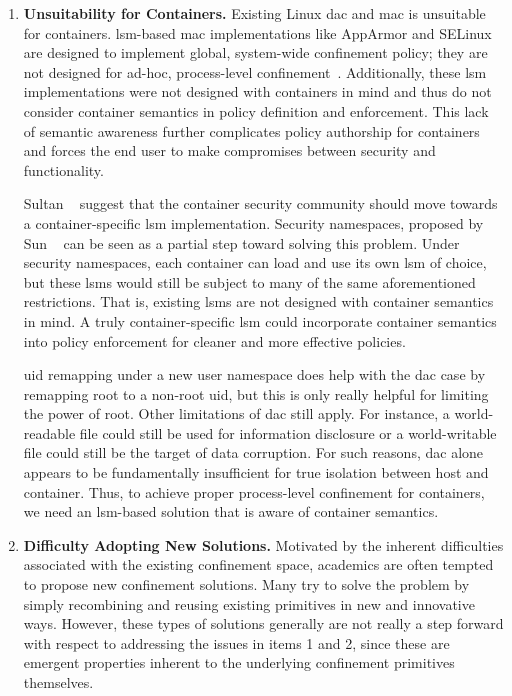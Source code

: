\documentclass[
  fontsize=12pt,
  titlepage=firstiscover,
  paper=letter,
oneside,
  cleardoublepage=plain,
  parskip=half-,
  DIV=10,
  parindent,
  appendixprefix,
  chapterprefix,
  listof=totoc,
]{scrbook}
\begin{document}
\begin{enumerate}[font=\bfseries]
  \item \label{i:problem-unsuitability} \textbf{Unsuitability for Containers.}
    Existing Linux \gls{dac} and \gls{mac} is unsuitable for containers.
    \gls{lsm}-based \gls{mac} implementations like AppArmor and SELinux are
    designed to implement global, system-wide confinement policy; they are not designed
    for ad-hoc, process-level confinement~\cite{belair2019_leveraging}. Additionally,
    these \gls{lsm} implementations were not designed with containers in mind and thus
    do not consider container semantics in policy definition and enforcement. This lack
    of semantic awareness further complicates policy authorship for containers and
    forces the end user to make compromises between security and functionality.

    Sultan \etal~\cite{sultan2019_container_security} suggest that the container
    security community should move towards a container-specific \gls{lsm}
    implementation. Security namespaces, proposed by Sun
    \etal~\cite{sun2018_security_namespace} can be seen as a partial step toward solving
    this problem.  Under security namespaces, each container can load and use its own
    \gls{lsm} of choice, but these \glspl{lsm} would still be subject to many of the
    same aforementioned restrictions. That is, existing \glspl{lsm} are not designed
    with container semantics in mind. A truly container-specific \gls{lsm} could incorporate
    container semantics into policy enforcement for cleaner and more effective policies.

    \gls{uid} remapping under a new user namespace does help with the \gls{dac} case by
    remapping root to a non-root \gls{uid}, but this is only really helpful for limiting
    the power of root. Other limitations of \gls{dac} still apply. For instance,
    a world-readable file could still be used for information disclosure or
    a world-writable file could still be the target of data corruption. For such reasons,
    \gls{dac} alone appears to be fundamentally insufficient for true isolation between
    host and container. Thus, to achieve proper process-level confinement for containers,
    we need an \gls{lsm}-based solution that is aware of container semantics.

  \item \label{i:problem-adoptability} \textbf{Difficulty Adopting New Solutions.}
    Motivated by the inherent difficulties associated with the existing confinement space,
    academics are often tempted to propose new confinement solutions. Many try to solve
    the problem by simply recombining and reusing existing primitives in new and
    innovative ways.  However, these types of solutions generally are not really a step
    forward with respect to addressing the issues in items 1 and 2, since these are
    emergent properties inherent to the underlying confinement primitives themselves.


\end{enumerate}
\end{document}
